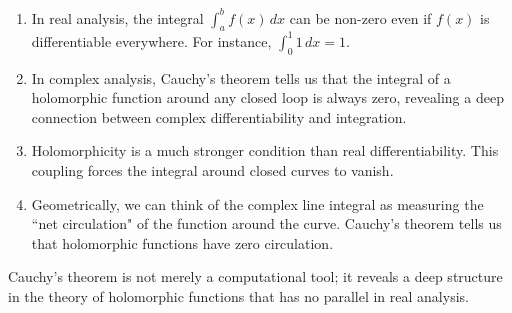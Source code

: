 \begin{enumerate}
    \item In real analysis, the integral $\int_a^b f(x) \, dx$ can be non-zero even if $f(x)$ is differentiable everywhere. For instance, $\int_0^1 1 \, dx = 1$.
    
    \item In complex analysis, Cauchy's theorem tells us that the integral of a holomorphic function around any closed loop is always zero, revealing a deep connection between complex differentiability and integration.
    
    \item Holomorphicity is a much stronger condition than real differentiability. This coupling forces the integral around closed curves to vanish.
    
    \item Geometrically, we can think of the complex line integral as measuring the ``net circulation" of the function around the curve. Cauchy's theorem tells us that holomorphic functions have zero circulation.
\end{enumerate}

\noindent Cauchy's theorem is not merely a computational tool; it reveals a deep structure in the theory of holomorphic functions that has no parallel in real analysis.

